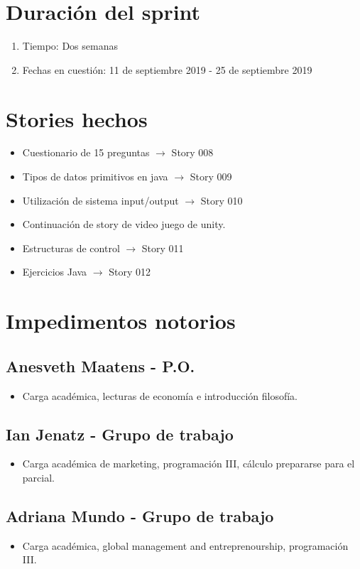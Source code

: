 \section{Duración del sprint}
\begin{enumerate}
    \item Tiempo: Dos semanas
    \item Fechas en cuestión: 11 de septiembre 2019 - 25 de septiembre 2019
\end{enumerate}
\section{Stories hechos}
\begin{itemize}
    \item Cuestionario de 15 preguntas $\rightarrow$ Story 008
    \item Tipos de datos primitivos en java $\rightarrow$ Story 009
    \item Utilización de sistema input/output $\rightarrow$ Story 010
    \item Continuación de story de video juego de unity.
    \item Estructuras de control $\rightarrow$ Story 011
    \item Ejercicios Java $\rightarrow$ Story 012
\end{itemize}

\section{Impedimentos notorios}
\subsection{Anesveth Maatens - P.O.}
\begin{itemize}
    \item Carga académica, lecturas de economía e introducción filosofía.
\end{itemize}
\subsection{Ian Jenatz - Grupo de trabajo}
\begin{itemize}
    \item Carga académica de marketing, programación III, cálculo prepararse para el parcial.
\end{itemize}
\subsection{Adriana Mundo - Grupo de trabajo}
\begin{itemize}
    \item Carga académica, global management and entreprenourship, programación III.
\end{itemize}


